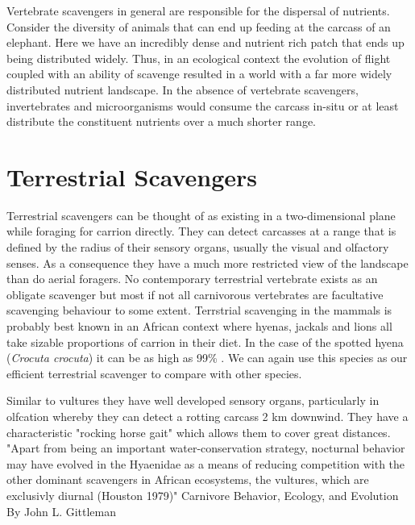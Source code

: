 \documentclass[a4paper,12pt]{article}
\begin{document}
Vertebrate scavengers in general are responsible for the dispersal of nutrients. Consider the diversity of animals that can end up feeding at the carcass of an elephant. Here we have an incredibly dense and nutrient rich patch that ends up being distributed widely. Thus, in an ecological context the evolution of flight coupled with an ability of scavenge resulted in a world with a far more widely distributed nutrient landscape. In the absence of vertebrate scavengers, invertebrates and microorganisms would consume the carcass in-situ or at least distribute the constituent nutrients over a much shorter range. 

\section{Terrestrial Scavengers}
Terrestrial scavengers can be thought of as existing in a two-dimensional plane while foraging for carrion directly. 
They can detect carcasses at a range that is defined by the radius of their sensory organs, usually the visual and olfactory senses. As a consequence they have a much more restricted view of the landscape than do aerial foragers. 
No contemporary terrestrial vertebrate exists as an obligate scavenger but most if not all carnivorous vertebrates are facultative scavenging behaviour to some extent. Terrstrial scavenging in the mammals is probably best known in an African context where hyenas, jackals and lions all take sizable proportions of carrion in their diet. In the case of the spotted hyena (\textit{Crocuta crocuta}) it can be as high as 99\% \citep{benbow2015introduction}. We can again use this species as our efficient terrestrial scavenger to compare with other species. 

Similar to vultures they have well developed sensory organs, particularly in olfcation whereby they can detect a rotting carcass 2 km downwind. They have a characteristic "rocking horse gait"  which allows them to cover great distances. "Apart from being an important water-conservation strategy, nocturnal behavior may have evolved in the Hyaenidae as a means of reducing competition with the other dominant scavengers in African ecosystems, the vultures, which are exclusivly diurnal (Houston 1979)" Carnivore Behavior, Ecology, and Evolution By John L. Gittleman
\end{document}
